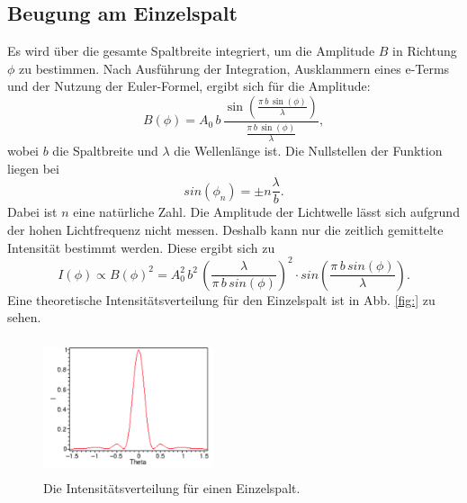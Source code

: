 \subsection{Beugung am Einzelspalt}
Es wird über die gesamte Spaltbreite integriert, um die 
Amplitude $B$ in Richtung $\phi$ zu bestimmen. Nach Ausführung 
der Integration, Ausklammern eines e-Terms und der Nutzung 
der Euler-Formel, ergibt sich für die Amplitude:
\begin{equation*}
    B(\phi) = A_0 \, b \, \frac{\sin(\frac{\pi \, b \, \sin(\phi)}{\lambda})}{\frac{\pi \, b \, \sin(\phi)}{\lambda}},
\end{equation*}
wobei $b$ die Spaltbreite und $\lambda$ 
die Wellenlänge ist. 
Die Nullstellen der Funktion liegen bei
\begin{equation} 
    sin(\phi_n)= \pm n \frac{\lambda}{b}.
    \label{eqn:nullstellen}
\end{equation}
Dabei ist $n$ eine natürliche Zahl.
Die Amplitude der Lichtwelle lässt sich aufgrund der hohen 
Lichtfrequenz nicht messen. Deshalb kann nur die zeitlich 
gemittelte Intensität bestimmt werden. 
\newline
Diese ergibt sich zu 
\begin{equation}
    I(\phi) \propto B(\phi)^2 = A^{2}_0 \, b^2 \, \left(\frac{\lambda}{\pi \, b \, sin(\phi)} \right)^2 \cdot sin \left(\frac{\pi \, b \, sin(\phi)}{\lambda}\right).
    \label{eqn:intensität}
\end{equation}
Eine theoretische Intensitätsverteilung für den Einzelspalt
ist in Abb. \ref{fig:} zu sehen.
\begin{figure}
    \centering
    \includegraphics[width=5cm, height=4cm]{build/Einzelspalt.png}
    \caption{Die Intensitätsverteilung für einen Einzelspalt. \cite{einzel}}
    \label{fig:einzel}
\end{figure}

